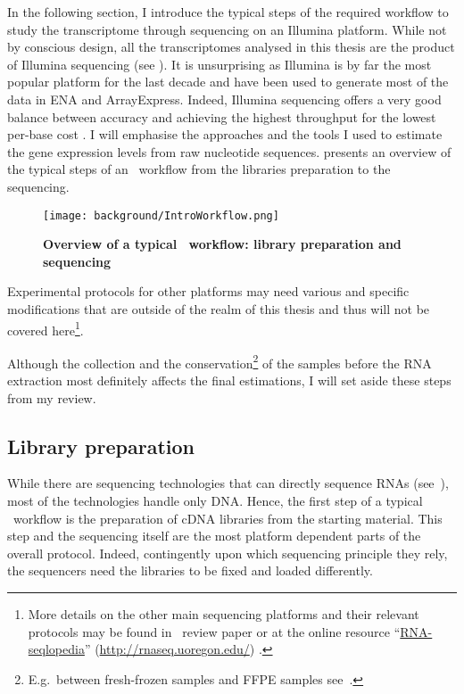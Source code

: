 In the following section,
I introduce the typical steps of the required workflow
to study the transcriptome through sequencing on an Illumina platform.
While not by conscious design, all the transcriptomes analysed in this thesis are
the product of Illumina sequencing (see
).
It is unsurprising as Illumina is by far
the most popular platform for the last decade  and
have been used to generate most of the data in \gls{ENA} and \gls{ArrayExpress}.
Indeed, Illumina sequencing offers a very
good balance between accuracy and achieving the highest
throughput for the lowest per-base cost .
I will emphasise the approaches and
the tools I used to estimate the gene expression levels from raw nucleotide
sequences.
 presents an overview of the typical steps of an
\Rnaseq\ workflow from the libraries preparation to the sequencing.\mybr\

\begin{figure}
    \texttt{[image: background/IntroWorkflow.png]}\centering
    \caption[Overview of a \Rnaseq\ workflow: library preparation
    and sequencing]{\label{fig:OverviewRnaseqPrepSeq}\textbf{Overview of
    a typical \Rnaseq\ workflow:
    library preparation and sequencing}}
\end{figure}

Experimental protocols for other platforms may need various and specific
modifications that are outside of the realm of this thesis and thus will not be
covered here\footnote{More details on the other main sequencing platforms and their
relevant protocols may be found in~\citet{rnaseqProtocols} review paper or at the
online resource \enquote{\href{http://rnaseq.uoregon.edu/}{RNA-seqlopedia}}
(\href{http://rnaseq.uoregon.edu/}{http://rnaseq.uoregon.edu/})
.}.\mybr\

Although the collection and the conservation\footnote{E.g.\ between fresh-frozen
samples and \gls{FFPE} samples see~\citet{sampleConservationMatters}.}
of the samples before the
\gls{RNA} extraction most definitely affects the final estimations,
I will set aside these steps from my review.\mybr\

\subsection{Library preparation}\label{subsec:libPrep}

While there are sequencing technologies that can directly sequence \glspl{RNA}
(see~\cite{rnaDirectSeq}), most of the technologies handle only \gls{DNA}.
Hence, the first step of a typical \Rnaseq\ workflow is the preparation of
\gls{cDNA} libraries from the starting material. This step and the sequencing
itself are the most platform dependent parts of the overall protocol.
Indeed, contingently upon which sequencing principle they rely,
the sequencers need the libraries to be fixed and loaded differently.\mybr\

